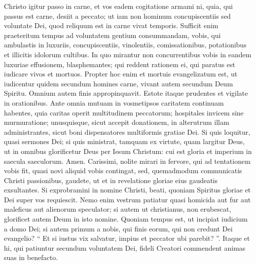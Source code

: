 \begin{biblechapter}
\begin{biblechapter}
\begin{biblechapter}
\begin{biblechapter}
\verse Christo igitur passo in carne, et vos eadem cogitatione armami ni, quia, qui passus est carne, desiit a peccato; 
\verse ut iam non hominum concupiscentiis sed voluntate Dei, quod reliquum est in carne vivat temporis. 
\verse Sufficit enim praeteritum tempus ad voluntatem gentium consummandam, vobis, qui ambulastis in luxuriis, concupiscentiis, vinolentiis, comissationibus, potationibus et illicitis idolorum cultibus. 
\verse In quo mirantur non concurrentibus vobis in eandem luxuriae effusionem, blasphemantes; 
\verse qui reddent rationem ei, qui paratus est iudicare vivos et mortuos. 
\verse Propter hoc enim et mortuis evangelizatum est, ut iudicentur quidem secundum homines carne, vivant autem secundum Deum Spiritu.
 \verse Omnium autem finis appropinquavit. Estote itaque prudentes et vigilate in orationibus. 
\verse Ante omnia mutuam in vosmetipsos caritatem continuam habentes, quia caritas operit multitudinem peccatorum; 
\verse hospitales invicem sine murmuratione; 
\verse unusquisque, sicut accepit donationem, in alterutrum illam administrantes, sicut boni dispensatores multiformis gratiae Dei. 
\verse Si quis loquitur, quasi sermones Dei; si quis ministrat, tamquam ex virtute, quam largitur Deus, ut in omnibus glorificetur Deus per Iesum Christum: cui est gloria et imperium in saecula saeculorum. Amen.
 \verse Carissimi, nolite mirari in fervore, qui ad tentationem vobis fit, quasi novi aliquid vobis contingat, 
\verse sed, quemadmodum communicatis Christi passionibus, gaudete, ut et in revelatione gloriae eius gaudeatis exsultantes. 
 \verse Si exprobramini in nomine Christi, beati, quoniam Spiritus gloriae et Dei super vos requiescit. 
\verse Nemo enim vestrum patiatur quasi homicida aut fur aut maleficus aut alienorum speculator; 
\verse si autem ut christianus, non erubescat, glorificet autem Deum in isto nomine.
 \verse Quoniam tempus est, ut incipiat iudicium a domo Dei; si autem primum a nobis, qui finis eorum, qui non credunt Dei evangelio?
 \verse “ Et si iustus vix salvatur,
 impius et peccator ubi parebit? ”.
 \verse Itaque et hi, qui patiuntur secundum voluntatem Dei, fideli Creatori commendent animas suas in benefacto.
 

\end{biblechapter}
\end{biblechapter}
\end{biblechapter}
\end{biblechapter}
